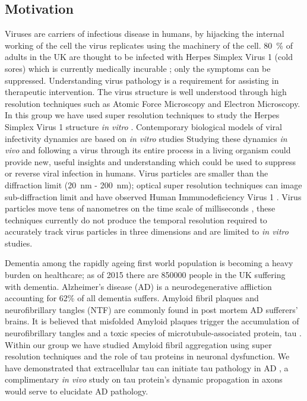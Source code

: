 \subsection{Motivation}
Viruses are carriers of infectious disease in humans, by hijacking the internal working of the cell the virus replicates using the machinery of the cell. \SI{80}{\percent} of adults in the UK are thought to be infected with Herpes Simplex Virus 1 (cold sores) which is currently medically incurable \cite{Herpes}; only the symptoms can be suppressed. Understanding virus pathology is a requirement for assisting in therapeutic intervention. The virus structure is well understood through high resolution techniques such as Atomic Force Microscopy and Electron Microscopy.  In this group we have used super resolution techniques to study the Herpes Simplex Virus 1 structure \textit{in vitro} \cite{Laine2015}. Contemporary biological models of viral infectivity dynamics are based on \textit{in vitro} studies %
Studying these dynamics \textit{in vivo} and following a virus through its entire process in a living organism could provide new, useful insights and understanding which could be used to suppress or reverse viral infection in humans. Virus particles are smaller than the diffraction limit  (\SI{20}{\nano\meter} - \SI{200}{\nano\meter}); optical super resolution techniques can image sub-diffraction limit and have observed Human Immunodeficiency Virus 1 \cite{Pereira2012}. Virus particles move tens of nanometres on the time scale of milliseconds \cite{Brandenburg2007}, these techniques currently do not produce the temporal resolution required to accurately track virus particles \cite{Brandenburg2007} in three dimensions and are limited to \textit{in vitro} studies.

Dementia among the rapidly ageing first world population is becoming a heavy burden on healthcare; as of 2015 there are \SI{850000}{} people in the UK suffering with dementia\cite{Judd}. Alzheimer's disease (AD) is a neurodegenerative affliction accounting for 62\% of all dementia suffers. Amyloid fibril plaques and neurofibrillary tangles (NTF) are commonly found in post mortem AD sufferers' brains. It is believed that misfolded Amyloid plaques trigger the accumulation of neurofibrillary tangles and a toxic species of microtubule-associated protein, tau \cite{Ittner2011,King2002}. Within our group we have studied Amyloid fibril aggregation using super resolution techniques and the role of tau proteins in neuronal dysfunction. We have demonstrated that extracellular tau can initiate tau pathology in AD \cite{Michel2014a}, a complimentary \textit{in vivo} study on tau protein's \cite{DeCalignon2012} dynamic propagation in axons would serve to elucidate AD pathology.


